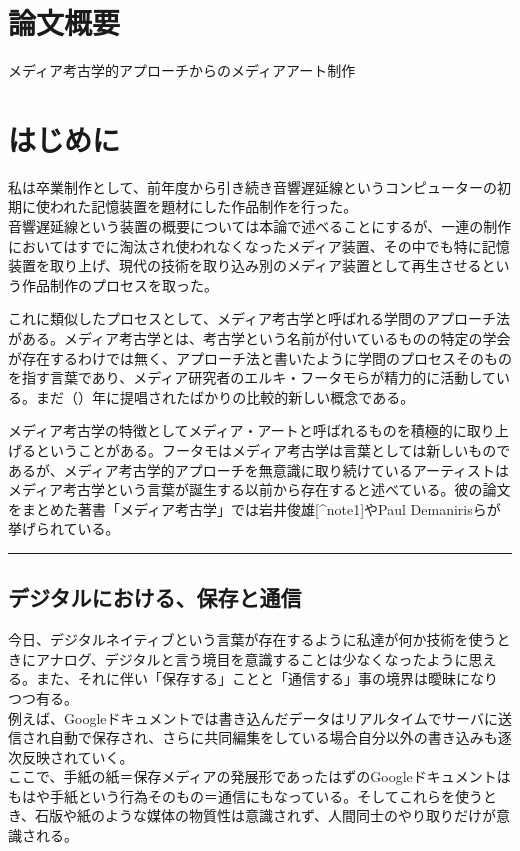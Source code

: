\section{論文概要}\label{ux8ad6ux6587ux6982ux8981}

メディア考古学的アプローチからのメディアアート制作

\section{はじめに}\label{ux306fux3058ux3081ux306b}

私は卒業制作として、前年度から引き続き音響遅延線というコンピューターの初期に使われた記憶装置を題材にした作品制作を行った。\\
音響遅延線という装置の概要については本論で述べることにするが、一連の制作においてはすでに淘汰され使われなくなったメディア装置、その中でも特に記憶装置を取り上げ、現代の技術を取り込み別のメディア装置として再生させるという作品制作のプロセスを取った。

これに類似したプロセスとして、メディア考古学と呼ばれる学問のアプローチ法がある。メディア考古学とは、考古学という名前が付いているものの特定の学会が存在するわけでは無く、アプローチ法と書いたように学問のプロセスそのものを指す言葉であり、メディア研究者のエルキ・フータモらが精力的に活動している。まだ（）年に提唱されたばかりの比較的新しい概念である。

メディア考古学の特徴としてメディア・アートと呼ばれるものを積極的に取り上げるということがある。フータモはメディア考古学は言葉としては新しいものであるが、メディア考古学的アプローチを無意識に取り続けているアーティストはメディア考古学という言葉が誕生する以前から存在すると述べている。彼の論文をまとめた著書「メディア考古学」では岩井俊雄{[}\^{}note1{]}やPaul
Demanirisらが挙げられている。

\begin{center}\rule{0.5\linewidth}{\linethickness}\end{center}

\subsection{デジタルにおける、保存と通信}\label{ux30c7ux30b8ux30bfux30ebux306bux304aux3051ux308bux4fddux5b58ux3068ux901aux4fe1}

今日、デジタルネイティブという言葉が存在するように私達が何か技術を使うときにアナログ、デジタルと言う境目を意識することは少なくなったように思える。また、それに伴い「保存する」ことと「通信する」事の境界は曖昧になりつつ有る。\\
例えば、Googleドキュメントでは書き込んだデータはリアルタイムでサーバに送信され自動で保存され、さらに共同編集をしている場合自分以外の書き込みも逐次反映されていく。\\
ここで、手紙の紙＝保存メディアの発展形であったはずのGoogleドキュメントはもはや手紙という行為そのもの＝通信にもなっている。そしてこれらを使うとき、石版や紙のような媒体の物質性は意識されず、人間同士のやり取りだけが意識される。

